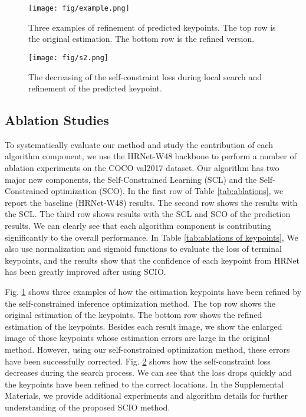 \documentclass[runningheads]{llncs}
\begin{document}
\begin{figure}
\centering
\setlength{\abovecaptionskip}{-0.05cm} 
\setlength{\belowcaptionskip}{-0.2cm} 
\texttt{[image: fig/example.png]}
\centering
\caption{Three examples of refinement of predicted keypoints. The top row is the original estimation. The bottom row is the refined version.}
\label{fig:example}
\end{figure}

\begin{figure}
\centering
\setlength{\abovecaptionskip}{-0.05cm} 
\setlength{\belowcaptionskip}{-0.4cm} 
\texttt{[image: fig/s2.png]}
\centering
\caption{The decreasing of the self-constraint loss during local search and refinement of the predicted keypoint.}
\label{fig:loss}
\end{figure}

\subsection{Ablation Studies}
To systematically evaluate our method and study the contribution of each algorithm component, we use the HRNet-W48 backbone to perform a number of ablation experiments on the COCO val2017 dataset. Our algorithm has two major new components, the Self-Constrained Learning (SCL) and the Self-Constrained  optimization (SCO). In the first row of Table \ref{tab:ablations}, we report the baseline (HRNet-W48) results. The second row shows the results with the SCL. The third row shows results with the SCL and SCO of the prediction results. We can clearly see that each algorithm component is contributing significantly to the overall performance. In Table \ref{tab:ablations of keypoints}, We also use normalization and sigmoid functions to evaluate the loss of terminal keypoints, and the results show that the confidence of each keypoint from HRNet has been greatly improved after using SCIO.


Fig. \ref{fig:example} shows three examples of how the estimation keypoints have been refined by the self-constrained inference optimization method. The top row shows the original estimation of the keypoints. The bottom row shows the refined estimation of the keypoints. Besides each result image, we show the enlarged image of those keypoints whose estimation errors are large in the original method. However, using our self-constrained optimization method, these errors have been successfully corrected.
Fig. \ref{fig:loss} shows how the self-constraint loss decreases during the search process. We can see that the loss drops quickly and the keypoints have been refined to the correct locations. 
In the Supplemental Materials, we provide additional experiments and algorithm details for further understanding of the proposed SCIO method.
\end{document}
